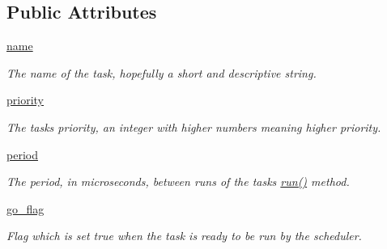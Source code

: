 \subsection*{Public Attributes}
\begin{DoxyCompactItemize}
\item 
\mbox{\hyperlink{classcotask_1_1_task_ab54e069dd0b4f0a2f8e7f00c94998a10}{name}}
\begin{DoxyCompactList}\small\item\em The name of the task, hopefully a short and descriptive string. \end{DoxyCompactList}\item 
\mbox{\hyperlink{classcotask_1_1_task_aeced93c7b7d23e33de9693d278aef88b}{priority}}
\begin{DoxyCompactList}\small\item\em The task\textquotesingle{}s priority, an integer with higher numbers meaning higher priority. \end{DoxyCompactList}\item 
\mbox{\hyperlink{classcotask_1_1_task_a44f980f61f1908764c6821fa886590ca}{period}}
\begin{DoxyCompactList}\small\item\em The period, in microseconds, between runs of the task\textquotesingle{}s {\ttfamily \mbox{\hyperlink{print__task_8py_abe2a60b9d48d38a4c9ec85bd891aafca}{run()}}} method. \end{DoxyCompactList}\item 
\mbox{\label{classcotask_1_1_task_a96733bb9f4349a3f284083d1d4e64f9f}} 
\mbox{\hyperlink{classcotask_1_1_task_a96733bb9f4349a3f284083d1d4e64f9f}{go\+\_\+flag}}
\begin{DoxyCompactList}\small\item\em Flag which is set true when the task is ready to be run by the scheduler. \end{DoxyCompactList}\end{DoxyCompactItemize}


